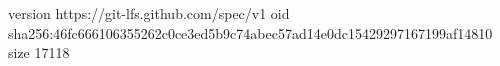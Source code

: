 version https://git-lfs.github.com/spec/v1
oid sha256:46fc666106355262c0ce3ed5b9c74abec57ad14e0dc15429297167199af14810
size 17118
